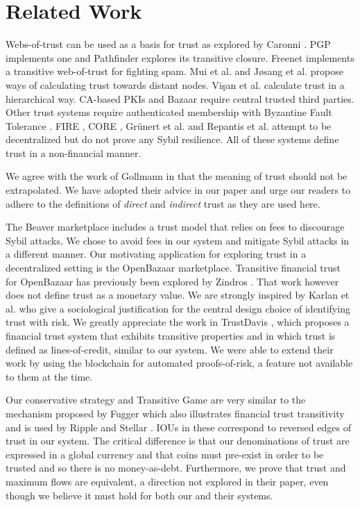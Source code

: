 \section{Related Work}
  Webs-of-trust can be used as a basis for trust as explored by Caronni \cite{wot}. PGP \cite{pgp} implements one and
  Pathfinder \cite{pathfinder} explores its transitive closure. Freenet \cite{freenet} implements a transitive web-of-trust
  for fighting spam. Mui et al. \cite{mui} and J\o{}sang et al. \cite{beta} propose ways of calculating trust towards distant
  nodes. Vi\c{s}an et al. \cite{vpc} calculate trust in a hierarchical way. CA-based PKIs \cite{pki} and Bazaar \cite{bazaar}
  require central trusted third parties. Other trust systems require authenticated membership with Byzantine Fault Tolerance
  \cite{byzantine}. FIRE \cite{fire}, CORE \cite{core}, Gr\"unert et al. \cite{ghkkw} and Repantis et al. \cite{rk} attempt to
  be decentralized but do not prove any Sybil resilience. All of these systems define trust in a non-financial manner.

  We agree with the work of Gollmann \cite{badtrust} in that the meaning of trust should not be extrapolated. We have adopted
  their advice in our paper and urge our readers to adhere to the definitions of \textit{direct} and \textit{indirect} trust
  as they are used here.

  The Beaver marketplace \cite{beaver} includes a trust model that relies on fees to discourage Sybil attacks. We chose to
  avoid fees in our system and mitigate Sybil attacks in a different manner. Our motivating application for exploring trust
  in a decentralized setting is the OpenBazaar marketplace. Transitive financial trust for OpenBazaar has previously been
  explored by Zindros \cite{dionyziz}. That work however does not define trust as a monetary value. We are strongly inspired
  by Karlan et al. \cite{kmrs} who give a sociological justification for the central design choice of identifying trust with
  risk. We greatly appreciate the work in TrustDavis \cite{davis}, which proposes a financial trust system that exhibits
  transitive properties and in which trust is defined as lines-of-credit, similar to our system. We were able to extend their
  work by using the blockchain for automated proofs-of-risk, a feature not available to them at the time.

  Our conservative strategy and Transitive Game are very similar to the mechanism proposed by Fugger \cite{iou} which also
  illustrates financial trust transitivity and is used by Ripple \cite{ripple} and Stellar \cite{stellar}. IOUs in these
  correspond to reversed edges of trust in our system. The critical difference is that our denominations of trust are
  expressed in a global currency and that coins must pre-exist in order to be trusted and so there is no money-as-debt.
  Furthermore, we prove that trust and maximum flows are equivalent, a direction not explored in their paper, even though we
  believe it must hold for both our and their systems.
